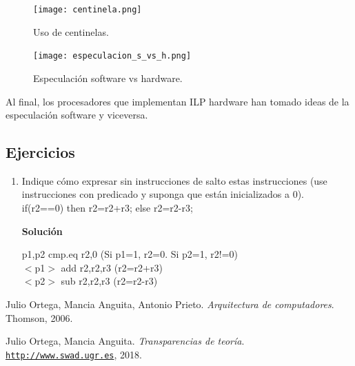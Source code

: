 \documentclass[12pt,spanish]{article}
\newenvironment{solution}{
	\par
	\textbf{Solución}
	\par
	\begin{center}
}
{
	\end{center}
}
\begin{document}
\begin{figure}[H]
\centering
\texttt{[image: centinela.png]}
\caption{Uso de centinelas.}
\end{figure}

\begin{figure}[H]
\centering
\texttt{[image: especulacion\_s\_vs\_h.png]}
\caption{Especulación software vs hardware.}
\end{figure}

Al final, los procesadores que implementan ILP hardware han tomado ideas de la especulación software y viceversa.

\newpage

\subsection{Ejercicios}


\begin{enumerate}
	\item Indique cómo expresar sin instrucciones de salto estas instrucciones (use instrucciones con predicado y suponga que están inicializados a 0).\\
	if(r2==0) then r2=r2+r3; else r2=r2-r3;
	\begin{solution}
		p1,p2 cmp.eq r2,0 (Si p1=1, r2=0. Si p2=1, r2!=0)\\
		$<$p1$>$ add r2,r2,r3 (r2=r2+r3)\\
		$<$p2$>$ sub r2,r2,r3 (r2=r2-r3)\\
	\end{solution}
\end{enumerate}















\begin{thebibliography}{9}

Julio Ortega, Mancia Anguita, Antonio Prieto. 
\textit{Arquitectura de computadores}. 
Thomson, 2006.
 
Julio Ortega, Mancia Anguita. 
\textit{Transparencias de teoría}. \\
\texttt{\url{http://www.swad.ugr.es}}, 2018.

\end{thebibliography}
\end{document}

